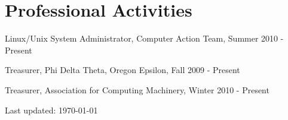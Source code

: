 \documentclass[10pt,letterpaper]{article}
\renewenvironment{itemize}{
  \begin{list}{}{
    \setlength{\leftmargin}{1.5em}
    \setlength{\itemsep}{0em}
    \setlength{\parskip}{0pt}
    \setlength{\parsep}{0em}
  }
}{
  \end{list}
}
\begin{document}
\section*{Professional Activities}

\begin{itemize}

\item Linux/Unix System Administrator, Computer Action Team, Summer 2010 - Present
\item Treasurer, Phi Delta Theta, Oregon Epsilon, Fall 2009 - Present
\item Treasurer, Association for Computing Machinery, Winter 2010 - Present

\end{itemize}

\bigskip

\begin{center}
  \begin{small}
    Last updated: \today
  \end{small}
\end{center}
\end{document}
